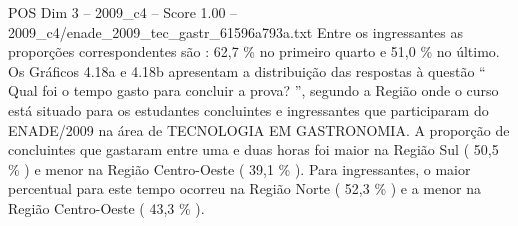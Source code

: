 \begin{textsample}{POS Dim 3 – 2009\_c4 – Score 1.00 – 2009\_c4/enade\_2009\_tec\_gastr\_61596a793a.txt}
Entre os ingressantes as proporções correspondentes são : 62,7 \% no primeiro quarto e 51,0 \% no último.
Os Gráficos 4.18a e 4.18b apresentam a distribuição das respostas à questão “ Qual foi o tempo gasto para concluir a prova? ”, segundo a Região onde o curso está situado para os estudantes concluintes e ingressantes que participaram do ENADE/2009 na área de TECNOLOGIA EM GASTRONOMIA.
A proporção de concluintes que gastaram entre uma e duas horas foi maior na Região Sul ( 50,5 \% ) e menor na Região Centro-Oeste ( 39,1 \% ).
Para ingressantes, o maior percentual para este tempo ocorreu na Região Norte ( 52,3 \% ) e a menor na Região Centro-Oeste ( 43,3 \% ).

\end{textsample}
